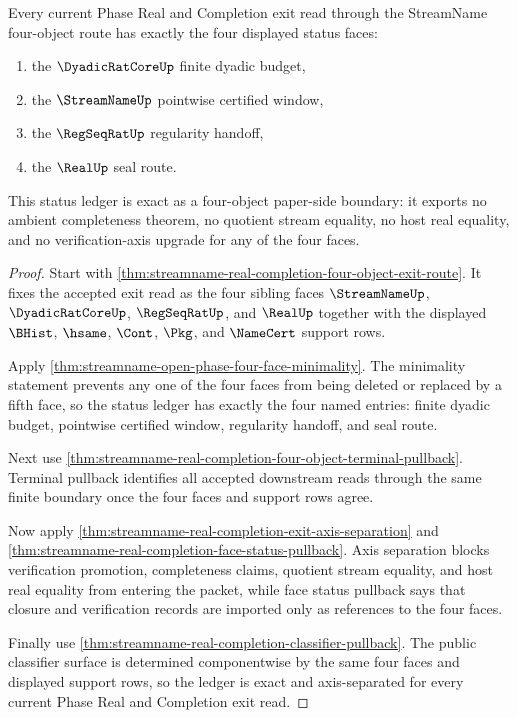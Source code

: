 \begin{theorem}
\label{thm:streamname-real-completion-status-ledger-exactness}
Every current Phase Real and Completion exit read through the StreamName four-object route has exactly the four displayed status faces:
\begin{enumerate}
\item the $\DyadicRatCoreUp$ finite dyadic budget,
\item the $\StreamNameUp$ pointwise certified window,
\item the $\RegSeqRatUp$ regularity handoff,
\item the $\RealUp$ seal route.
\end{enumerate}
This status ledger is exact as a four-object paper-side boundary: it exports no ambient completeness theorem, no quotient stream equality, no host real equality, and no verification-axis upgrade for any of the four faces.
\end{theorem}
\begin{proof}
Start with \autoref{thm:streamname-real-completion-four-object-exit-route}. It fixes the accepted exit read as the four sibling faces $\StreamNameUp$, $\DyadicRatCoreUp$, $\RegSeqRatUp$, and $\RealUp$ together with the displayed $\BHist$, $\hsame$, $\Cont$, $\Pkg$, and $\NameCert$ support rows.

Apply \autoref{thm:streamname-open-phase-four-face-minimality}. The minimality statement prevents any one of the four faces from being deleted or replaced by a fifth face, so the status ledger has exactly the four named entries: finite dyadic budget, pointwise certified window, regularity handoff, and seal route.

Next use \autoref{thm:streamname-real-completion-four-object-terminal-pullback}. Terminal pullback identifies all accepted downstream reads through the same finite boundary once the four faces and support rows agree.

Now apply \autoref{thm:streamname-real-completion-exit-axis-separation} and \autoref{thm:streamname-real-completion-face-status-pullback}. Axis separation blocks verification promotion, completeness claims, quotient stream equality, and host real equality from entering the packet, while face status pullback says that closure and verification records are imported only as references to the four faces.

Finally use \autoref{thm:streamname-real-completion-classifier-pullback}. The public classifier surface is determined componentwise by the same four faces and displayed support rows, so the ledger is exact and axis-separated for every current Phase Real and Completion exit read.
\end{proof}

